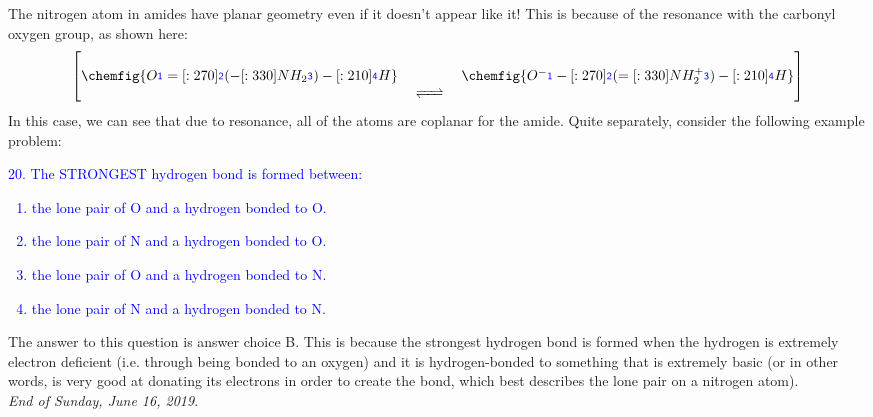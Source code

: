 \documentclass{article}
\newcommand{\mcfatomno}[1]{\raisebox{2pt}{\color{blue}{\ensuremath{\mathsf{_{#1}}}}}}
\theoremstyle{plain}%
\theoremstyle{definition}
\theoremstyle{remark}
\begin{document}
\indent The nitrogen atom in amides have planar geometry even if it doesn't appear like it! This is because of the resonance with the carbonyl oxygen group, as shown here:
\begin{equation}
\begin{split}
\begin{bmatrix}
\chemfig{
           O\mcfatomno{1}%
    =[:270]\mcfatomno{2}%
              (
        -[:330]{NH_2}\mcfatomno{3}%
              )
    -[:210]\mcfatomno{4}H%
}
\quad\begin{matrix}
\\
\\
\text{\ce{<=>}}
\end{matrix}\quad
\chemfig{
           {O^-}\mcfatomno{1}%
    -[:270]\mcfatomno{2}%
              (
        =[:330]{NH_2^+}\mcfatomno{3}%
              )
    -[:210]\mcfatomno{4}H%
}
\end{bmatrix}
\end{split}
\end{equation}
\noindent In this case, we can see that due to resonance, all of the atoms are coplanar for the amide. Quite separately, consider the following example problem:
\begin{center}
\begin{minipage}{30em}
\textcolor{blue}{20. \quad The STRONGEST hydrogen bond is formed between:
\begin{enumerate}[label=\Alph*]
	\item the lone pair of O and a hydrogen bonded to O.
	\item the lone pair of N and a hydrogen bonded to O.
	\item the lone pair of O and a hydrogen bonded to N.
	\item the lone pair of N and a hydrogen bonded to N.
\end{enumerate}}
\end{minipage}
\end{center}
\noindent The answer to this question is answer choice B. This is because the strongest hydrogen bond is formed when the hydrogen is extremely electron deficient (i.e. through being bonded to an oxygen) and it is hydrogen-bonded to something that is extremely basic (or in other words, is very good at donating its electrons in order to create the bond, which best describes the lone pair on a nitrogen atom). \\
\noindent \footnotesize \textit{End of Sunday, June 16, 2019.}
\normalsize
\end{document}
